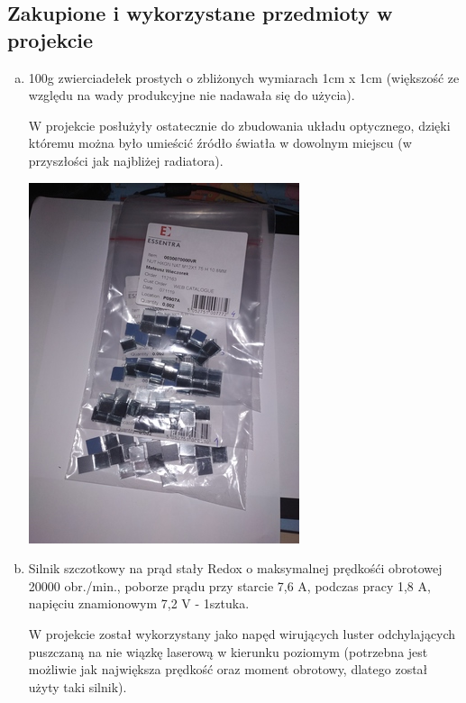 \documentclass[a4paper,oneside,11pt]{report}
\begin{document}
\subsection{Zakupione i wykorzystane przedmioty w projekcie}
\begin{enumerate}[a)]
\item 100g zwierciadełek prostych o zbliżonych wymiarach 1cm x 1cm (większość ze względu na wady produkcyjne nie nadawała się do użycia).

W projekcie posłużyły ostatecznie do zbudowania układu optycznego, dzięki któremu można było umieścić źródło światła w dowolnym miejscu (w przyszłości jak najbliżej radiatora).

\includegraphics[scale=0.5]{images/1.jpg}
\item Silnik szczotkowy na prąd stały Redox o maksymalnej prędkośći obrotowej 20000 obr./min., poborze prądu przy starcie 7,6 A, podczas pracy 1,8 A, napięciu znamionowym 7,2 V - 1sztuka.

W projekcie został wykorzystany jako napęd wirujących luster odchylających puszczaną na nie wiązkę laserową w kierunku poziomym (potrzebna jest możliwie jak największa prędkość oraz moment obrotowy, dlatego został użyty taki silnik).


\end{enumerate}
\end{document}
